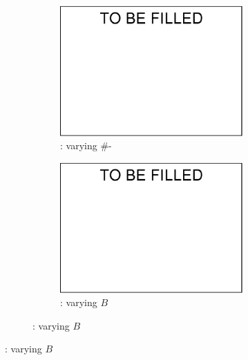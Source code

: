 {\begin{figure}[tb!]
\begin{subfigure}[b]{1.00\textwidth}
\begin{subfigure}[b]{0.245\textwidth}
          \includegraphics[width=1\textwidth]{fig/a.eps}
          \begin{center}
            \vspace{-2ex}\caption{\tpch: varying \#-}
            \label{tpch-1-vary-join} 
          \end{center}
          \vspace{-1ex}
        \end{subfigure}
  		\begin{subfigure}[b]{0.245\textwidth}
          \centering
          \includegraphics[width=1\textwidth]{fig/a.eps}
          \begin{center}
            \vspace{-2ex}\caption{\tpch: varying $B$}

\end{center}
\end{subfigure}
\end{subfigure}
\end{figure}}
